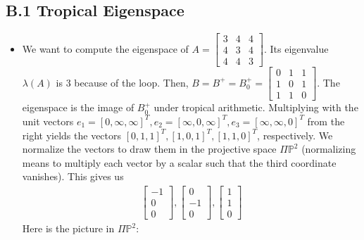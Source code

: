 \documentclass{article}
\begin{document}
\subsection*{B.1 Tropical Eigenspace}

\begin{itemize}
	\item We want to compute the eigenspace of 
	\( 
		A = 
		\begin{bmatrix}
			3 & 4 & 4 \\ 4 & 3 & 4 \\ 4 & 4 & 3 
		\end{bmatrix}
	\).
	Its eigenvalue \( \lambda(A) \) is \( 3 \) because of the loop. Then, 
	\( 
		B = B^+ = B^+_0 =
		\begin{bmatrix}
			0 & 1 & 1 \\ 1 & 0 & 1 \\ 1 & 1 & 0
		\end{bmatrix}.
	\)
		The eigenspace is the image of \( B_0^+ \) under tropical arithmetic. Multiplying with the unit vectors \( e_1 = [0, \infty, \infty]^T, e_2 = [\infty, 0, \infty]^T, e_3 = [\infty, \infty, 0]^T \) from the right yields the vectors \( [0,1,1]^T, [1,0,1]^T, [1,1,0]^T \), respectively. We normalize the vectors to draw them in the projective space \( \Pi \mathbb{P}^2 \) (normalizing means to multiply each vector by a scalar such that the third coordinate vanishes). This gives us 
		\begin{align*}
			\begin{bmatrix}
				-1 \\ 0 \\ 0
			\end{bmatrix},
			\begin{bmatrix}
				0 \\ -1 \\ 0
			\end{bmatrix},
			\begin{bmatrix}
				1 \\ 1 \\ 0
			\end{bmatrix}
		\end{align*}
		Here is the picture in \( \Pi \mathbb{P}^2 \):
		\begin{figure}[H]
			\centering
\end{figure}
\end{itemize}
\end{document}
